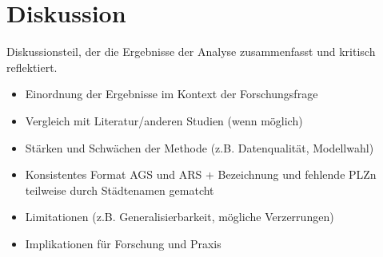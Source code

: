 \newpage

\section{Diskussion} \label{diskussion}
Diskussionsteil, der die Ergebnisse der Analyse zusammenfasst und kritisch reflektiert.

\begin{itemize}
    \item Einordnung der Ergebnisse im Kontext der Forschungsfrage
    \item Vergleich mit Literatur/anderen Studien (wenn möglich)
    \item Stärken und Schwächen der Methode (z.B. Datenqualität, Modellwahl)
    \item Konsistentes Format AGS und ARS + Bezeichnung und fehlende PLZn teilweise durch Städtenamen gematcht
    \item Limitationen (z.B. Generalisierbarkeit, mögliche Verzerrungen)
    \item Implikationen für Forschung und Praxis
\end{itemize}
